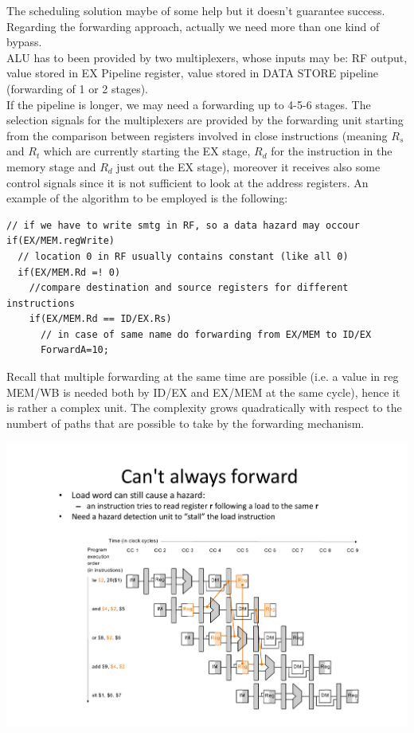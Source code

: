 The scheduling solution maybe of some help but it doesn't guarantee success.
Regarding the forwarding approach, actually we need more than one kind of
bypass.\\
ALU has to been provided by two multiplexers, whose inputs may be: RF output,
value stored in EX Pipeline register, value stored in DATA STORE pipeline
(forwarding of 1 or 2 stages).\\
If the pipeline is longer, we may need a forwarding up to 4-5-6 stages. The
selection signals for the multiplexers are provided by the forwarding unit
starting from the comparison between registers involved in close instructions
(meaning $R_s$ and $R_t$ which are currently starting the EX stage, $R_d$ for
the instruction in the memory stage and $R_d$ just out the EX stage), moreover
it receives also some control signals since it is not sufficient to look at
the address registers. An example of the algorithm to be employed is the
following:
\begin{verbatim}
// if we have to write smtg in RF, so a data hazard may occour
if(EX/MEM.regWrite)
  // location 0 in RF usually contains constant (like all 0)
  if(EX/MEM.Rd =! 0)
    //compare destination and source registers for different instructions
    if(EX/MEM.Rd == ID/EX.Rs)
      // in case of same name do forwarding from EX/MEM to ID/EX
      ForwardA=10;
\end{verbatim}
Recall that multiple forwarding at the same time are possible (i.e. a value in
reg MEM/WB is needed both by ID/EX and EX/MEM at the same cycle), hence it is
rather a complex unit. The complexity grows quadratically with respect to the
numbert of paths that are possible to take by the forwarding mechanism.
\begin{center}
  \includegraphics[width=1.0\linewidth]{img/img3/mips5}
\end{center}
